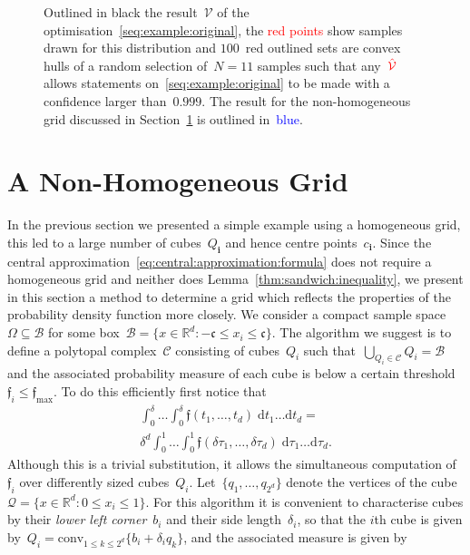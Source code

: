 \documentclass[letterpaper, 10pt, conference]{ieeeconf} %
\providecommand{\conv}{\text{conv}}
\providecommand{\bfa}[1]{\mathbf{#1}}
\begin{document}
\begin{figure}\centering

\captionsetup{font=small}
\caption{Outlined in black the result~$\mathcal V$ of the optimisation~\eqref{seq:example:original}, the \textcolor{red}{red points} show samples drawn for this distribution and $100$~red outlined sets are convex hulls of a random selection of~$N=11$ samples such that any~$\textcolor{red}{\hat{\mathcal V}}$ allows statements on~\eqref{seq:example:original} to be made with a confidence larger than~$0.999$.
%
The result for the non-homogeneous grid discussed in Section~\ref{sec:improved:grid} is outlined in~\textcolor{blue}{blue}.}
\label{fig:example:in:comparison}
\end{figure}
%
%
%
\section{A Non-Homogeneous Grid}\label{sec:improved:grid}
%
%
%
\noindent In the previous section we presented a simple example using a homogeneous grid, this led to a large number of cubes~$Q_\bfa{i}$ and hence centre points~$c_\bfa{i}$.
%
Since the central approximation~\eqref{eq:central:approximation:formula} does not require a homogeneous grid and neither does Lemma~\ref{thm:sandwich:inequality}, we present in this section a method to determine a grid which reflects the properties of the probability density function more closely.
%
We consider a compact sample space~$\Omega\subseteq\mathcal B$ for some box~$\mathcal B=\{x\in\mathbb R^d:-\mathfrak{c}\leq x_i\leq \mathfrak{c}\}$.
%
The algorithm we suggest is to define a polytopal complex~$\mathcal C$ consisting of cubes~$Q_i$ such that~$\bigcup_{Q_i\in\mathcal C}Q_i=\mathcal B$ and the associated probability measure of each cube is below a certain threshold~$\mathfrak{f}_i\leq\mathfrak{f}_{\max}$.
%
To do this efficiently first notice that
\begin{multline*}
\int_0^{\delta}\dots\int_0^\delta \mathfrak{f}(t_1,\dots,t_d)\; \mathrm d t_1\dots \mathrm dt _d = \\ \delta^d\int_0^1\dots\int_0^1 \mathfrak {f}(\delta\tau_1,\dots,\delta\tau_d)
\; \mathrm d\tau_1\dots \mathrm d\tau_d .
\end{multline*}
Although this is a trivial substitution, it allows the simultaneous computation of~$\mathfrak{f}_i$ over differently sized cubes~$Q_i$.
%
Let~$\{q_1,\dots,q_{2^d}\}$ denote the vertices of the cube~$\mathcal Q=\{x\in\mathbb R^d: 0\leq x_i\leq 1\}$. For this algorithm it is convenient to characterise cubes by their \emph{lower left corner}~$b_i$ and their side length~$\delta_i$, so that the $i$th cube is given by~$Q_i=\conv_{1\leq k\leq2^d}\{b_i+\delta_i q_k\}$, and the associated measure is given by
\end{document}
